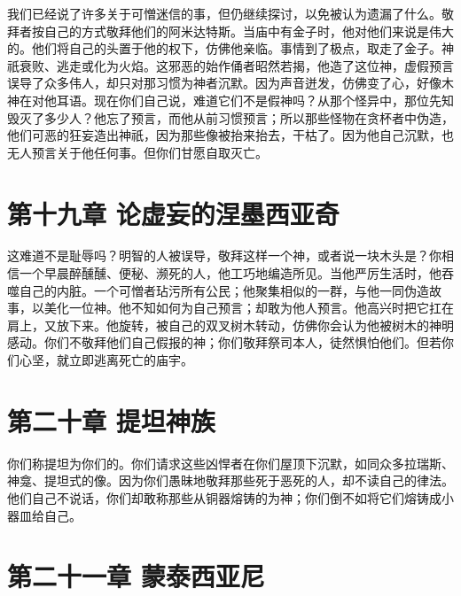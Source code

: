 我们已经说了许多关于可憎迷信的事，但仍继续探讨，以免被认为遗漏了什么。敬拜者按自己的方式敬拜他们的阿米达特斯。当庙中有金子时，他对他们来说是伟大的。他们将自己的头置于他的权下，仿佛他亲临。事情到了极点，取走了金子。神祇衰败、逃走或化为火焰。这邪恶的始作俑者昭然若揭，他造了这位神，虚假预言误导了众多伟人，却只对那习惯为神者沉默。因为声音迸发，仿佛变了心，好像木神在对他耳语。现在你们自己说，难道它们不是假神吗？从那个怪异中，那位先知毁灭了多少人？他忘了预言，而他从前习惯预言；所以那些怪物在贪杯者中伪造，他们可恶的狂妄造出神祇，因为那些像被抬来抬去，干枯了。因为他自己沉默，也无人预言关于他任何事。但你们甘愿自取灭亡。\par


\section{第十九章 论虚妄的涅墨西亚奇}

这难道不是耻辱吗？明智的人被误导，敬拜这样一个神，或者说一块木头是？你相信一个早晨醉醺醺、便秘、濒死的人，他工巧地编造所见。当他严厉生活时，他吞噬自己的内脏。一个可憎者玷污所有公民；他聚集相似的一群，与他一同伪造故事，以美化一位神。他不知如何为自己预言；却敢为他人预言。他高兴时把它扛在肩上，又放下来。他旋转，被自己的双叉树木转动，仿佛你会认为他被树木的神明感动。你们不敬拜他们自己假报的神；你们敬拜祭司本人，徒然惧怕他们。但若你们心坚，就立即逃离死亡的庙宇。\par


\section{第二十章 提坦神族}

你们称提坦为你们的。你们请求这些凶悍者在你们屋顶下沉默，如同众多拉瑞斯、神龛、提坦式的像。因为你们愚昧地敬拜那些死于恶死的人，却不读自己的律法。他们自己不说话，你们却敢称那些从铜器熔铸的为神；你们倒不如将它们熔铸成小器皿给自己。\par


\section{第二十一章 蒙泰西亚尼}

